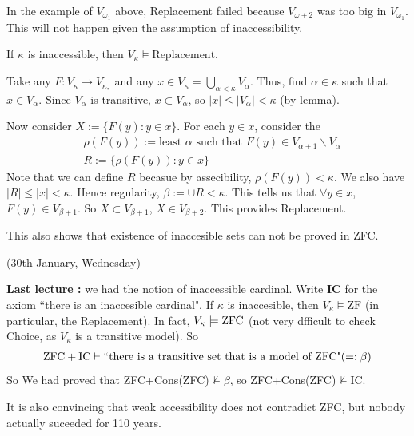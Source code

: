 \documentclass[12pt,a4paper]{article}
\newenvironment{proof}
{\begin{changemargin}{0.5cm}{0.5cm} 
	}%
	{\end{changemargin}
}
\newenvironment{p}
{\begin{proof} 
	}%
	{\end{proof}
}
\begin{document}
In the example of $V_{\omega_1}$ above, Replacement failed because $V_{\omega + 2}$ was too big in $V_{\omega_1}$. This will not happen given the assumption of inaccessibility.
\s

\thm If $\kappa$ is inaccessible, then $V_{\kappa} \models \text{Replacement}$.
\begin{p}
\pf

\quad Take any $F:V_{\kappa} \rightarrow V_{\kappa;}$ and any $x\in V_{\kappa} =\bigcup_{\alpha < \kappa}V_{\alpha}$. Thus, find $\alpha \in \kappa$ such that $x\in V_{\alpha}$. Since $V_{\alpha}$ is transitive, $x\subset V_{\alpha}$, so $|x| \leq |V_{\alpha}| < \kappa$ (by lemma).

\quad Now consider $X:=\{F(y) : y\in x\}$. For each $y\in x$, consider the 
\begin{align*}
&\rho(F(y)) :=\text{least } \alpha \text{ such that }F(y) \in V_{\alpha +1}\backslash V_{\alpha}\\
& R:= \{ \rho(F(y)) : y\in x\}
\end{align*}
Note that we can define $R$ becasue by assecibility, $\rho(F(y))< \kappa$. We also have $|R| \leq |x|< \kappa$. Hence regularity, $\beta := \cup R < \kappa$. This tells us that $\forall y\in x$, $F(y)\in V_{\beta +1}$. So $X\subset V_{\beta+1}$, $X\in V_{\beta+2}$. This provides Replacement.

\eop 
\end{p}
\s

This also shows that existence of inaccesible sets can not be proved in ZFC.
\s

\newday

(30th January, Wednesday)
\s

\textbf{Last lecture :} we had the notion of inaccessible cardinal. Write \textbf{IC} for the axiom ``there is an inaccesible cardinal". If $\kappa$ is inaccesible, then $V_{\kappa} \models \text{ZF}$ (in particular, the Replacement). In fact, $V_{\kappa} \models \text{ZFC}$ (not very dfficult to check Choice, as $V_{\kappa}$ is a transitive model). So
\begin{align*}
\text{ZFC} + \text{IC} \vdash \text{``there is a transitive set that is a model of ZFC"} (=: \beta)
\end{align*}
So We had proved that ZFC+Cons(ZFC)$\not\models \beta$, so ZFC+Cons(ZFC)$\not\models$IC.
\s

It is also convincing that weak accessibility does not contradict ZFC, but nobody actually suceeded for 110 years.
\s
\end{document}
